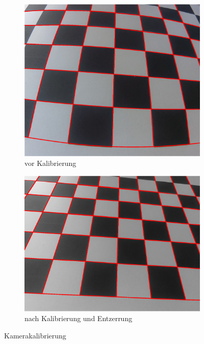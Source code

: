 \begin{figure}[!htb]
	\centering
\begin{subfigure}{.5\textwidth}
	\centering
	\includegraphics[scale=.35]{images/calibrationRaspi.eps}
	\caption{vor Kalibrierung}
	\label{fig:calibDist}
\end{subfigure}%
\begin{subfigure}{.5\textwidth}
	\centering
	\includegraphics[scale=.4]{images/calibrationRaspi2.eps}
	\caption{nach Kalibrierung und Entzerrung}
	\label{fig:calibUndist}
\end{subfigure}
\caption{Kamerakalibrierung}
\label{fig:calib}
\end{figure}



